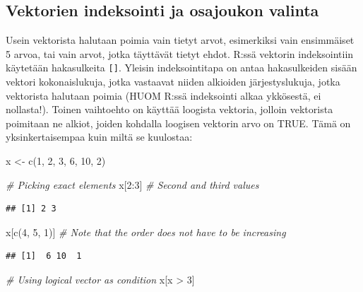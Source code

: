 \documentclass[
]{book}
\newenvironment{Shaded}{\begin{snugshade}}{\end{snugshade}}
\newcommand{\CommentTok}[1]{\textcolor[rgb]{0.56,0.35,0.01}{\textit{#1}}}
\newcommand{\DecValTok}[1]{\textcolor[rgb]{0.00,0.00,0.81}{#1}}
\newcommand{\FunctionTok}[1]{\textcolor[rgb]{0.00,0.00,0.00}{#1}}
\newcommand{\NormalTok}[1]{#1}
\newcommand{\OtherTok}[1]{\textcolor[rgb]{0.56,0.35,0.01}{#1}}
\newcommand{\SpecialCharTok}[1]{\textcolor[rgb]{0.00,0.00,0.00}{#1}}
\begin{document}
\hypertarget{vektorien-indeksointi-ja-osajoukon-valinta}{%
\subsection{Vektorien indeksointi ja osajoukon valinta}\label{vektorien-indeksointi-ja-osajoukon-valinta}}

Usein vektorista halutaan poimia vain tietyt arvot, esimerkiksi vain ensimmäiset 5 arvoa, tai vain arvot, jotka täyttävät tietyt ehdot. R:ssä vektorin indeksointiin käytetään hakasulkeita \texttt{{[}{]}}. Yleisin indeksointitapa on antaa hakasulkeiden sisään vektori kokonaislukuja, jotka vastaavat niiden alkioiden järjestyslukuja, jotka vektorista halutaan poimia (HUOM R:ssä indeksointi alkaa ykkösestä, ei nollasta!). Toinen vaihtoehto on käyttää loogista vektoria, jolloin vektorista poimitaan ne alkiot, joiden kohdalla loogisen vektorin arvo on TRUE. Tämä on yksinkertaisempaa kuin miltä se kuulostaa:

\begin{Shaded}
\begin{Highlighting}[]
\NormalTok{x }\OtherTok{\textless{}{-}} \FunctionTok{c}\NormalTok{(}\DecValTok{1}\NormalTok{, }\DecValTok{2}\NormalTok{, }\DecValTok{3}\NormalTok{, }\DecValTok{6}\NormalTok{, }\DecValTok{10}\NormalTok{, }\DecValTok{2}\NormalTok{)}

\CommentTok{\# Picking exact elements}
\NormalTok{x[}\DecValTok{2}\SpecialCharTok{:}\DecValTok{3}\NormalTok{] }\CommentTok{\# Second and third values}
\end{Highlighting}
\end{Shaded}

\begin{verbatim}
## [1] 2 3
\end{verbatim}

\begin{Shaded}
\begin{Highlighting}[]
\NormalTok{x[}\FunctionTok{c}\NormalTok{(}\DecValTok{4}\NormalTok{, }\DecValTok{5}\NormalTok{, }\DecValTok{1}\NormalTok{)] }\CommentTok{\# Note that the order does not have to be increasing}
\end{Highlighting}
\end{Shaded}

\begin{verbatim}
## [1]  6 10  1
\end{verbatim}

\begin{Shaded}
\begin{Highlighting}[]
\CommentTok{\# Using logical vector as condition}
\NormalTok{x[x }\SpecialCharTok{\textgreater{}} \DecValTok{3}\NormalTok{]}
\end{Highlighting}
\end{Shaded}
\end{document}
